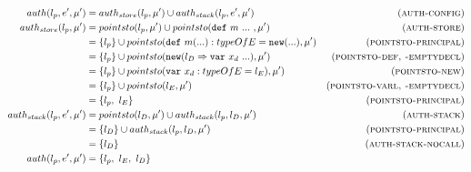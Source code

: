\documentclass{llncs}
\newcommand{\keywadj}[1]{\mathtt{#1}}
\newcommand{\keyw}[1]{\keywadj{#1}~}
\begin{document}
\begin{align*}
auth(l_p, e', \mu') &= auth_{store}(l_p, \mu') \cup auth_{stack}(l_p, e', \mu') & (\textsc{auth-config})\\
auth_{store}(l_p, \mu') &= pointsto(l_p, \mu') \cup pointsto(\keyw{def} m~...~, \mu') & (\textsc{auth-store})\\
 &= \{ l_p \} \cup pointsto(\keyw{def} m(...) : typeOfE = \keywadj{new}(...), \mu') & (\textsc{pointsto-principal})\\
 &= \{ l_p \} \cup pointsto(\keywadj{new}(l_D \Rightarrow \keyw{var} x_d~...), \mu') & (\textsc{pointsto-def, -emptydecl})\\
 &= \{ l_p \} \cup pointsto(\keyw{var} x_d : typeOfE = l_E), \mu') & (\textsc{pointsto-new})\\
 &= \{ l_p \} \cup pointsto(l_E, \mu') & (\textsc{pointsto-varl, -emptydecl})\\ 
 &= \{ l_p,~l_E \} & (\textsc{pointsto-principal})\\
auth_{stack}(l_p, e', \mu') &= pointsto(l_D, \mu') \cup auth_{stack}(l_p, l_D, \mu') & (\textsc{auth-stack})\\
 &= \{ l_D \} \cup auth_{stack}(l_p, l_D, \mu') & (\textsc{pointsto-principal})\\
 &= \{ l_D \} & (\textsc{auth-stack-nocall})\\
auth(l_p, e', \mu') &= \{ l_p,~l_E,~l_D \} &\\
\end{align*}
\end{document}
